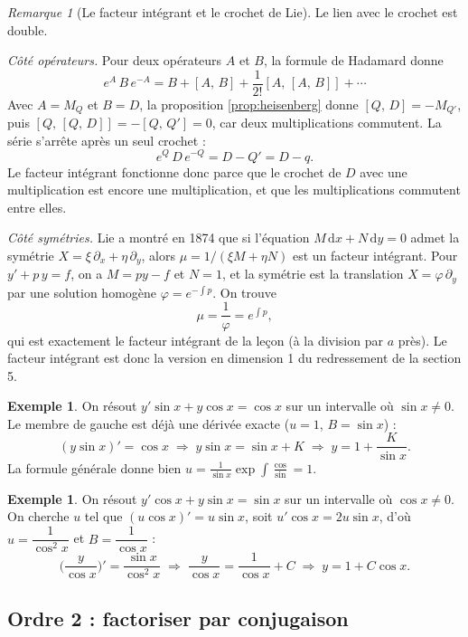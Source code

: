 \documentclass[11pt,a4paper]{article}
\theoremstyle{plain}
\theoremstyle{definition}
\newtheorem{exemple}[theoreme]{Exemple}
\theoremstyle{remark}
\newtheorem{remarque}[theoreme]{Remarque}
\newcommand{\Dx}{D}
\newcommand{\M}[1]{M_{#1}}
\newcommand{\cro}[2]{\left[#1,\,#2\right]}
\newcommand{\dd}{\mathrm{d}}
\begin{document}
\begin{remarque}[Le facteur intégrant et le crochet de Lie]
Le lien avec le crochet est double.

\emph{Côté opérateurs.} Pour deux opérateurs $A$ et $B$, la formule de Hadamard donne
\[
  e^{A}\,B\,e^{-A} = B + \cro{A}{B} + \frac{1}{2!}\cro{A}{\cro{A}{B}} + \cdots
\]
Avec $A = \M{Q}$ et $B = \Dx$, la proposition \ref{prop:heisenberg} donne $\cro{Q}{\Dx} = -\M{Q'}$, puis $\cro{Q}{\cro{Q}{\Dx}} = -\cro{Q}{Q'} = 0$, car deux multiplications commutent. La série s'arrête après un seul crochet :
\[
  e^{Q}\,\Dx\,e^{-Q} = \Dx - Q' = \Dx - q .
\]
Le facteur intégrant fonctionne donc parce que le crochet de $\Dx$ avec une multiplication est encore une multiplication, et que les multiplications commutent entre elles.

\emph{Côté symétries.} Lie a montré en 1874 que si l'équation $M\,\dd x + N\,\dd y = 0$ admet la symétrie $X = \xi\,\partial_x + \eta\,\partial_y$, alors $\mu = 1/(\xi M + \eta N)$ est un facteur intégrant. Pour $y' + p\,y = f$, on a $M = py - f$ et $N = 1$, et la symétrie est la translation $X = \varphi\,\partial_y$ par une solution homogène $\varphi = e^{-\int p}$. On trouve
\[
  \mu = \frac{1}{\varphi} = e^{\int p},
\]
qui est exactement le facteur intégrant de la leçon (à la division par $a$ près). Le facteur intégrant est donc la version en dimension 1 du redressement de la section 5.
\end{remarque}

\begin{exemple}
On résout $y'\sin x + y\cos x = \cos x$ sur un intervalle où $\sin x \neq 0$. Le membre de gauche est déjà une dérivée exacte ($u = 1$, $B = \sin x$) :
\[
  (y\sin x)' = \cos x
  \;\Longrightarrow\;
  y\sin x = \sin x + K
  \;\Longrightarrow\;
  y = 1 + \frac{K}{\sin x}.
\]
La formule générale donne bien $u = \frac{1}{\sin x}\exp\int\frac{\cos}{\sin} = 1$.
\end{exemple}

\begin{exemple}
On résout $y'\cos x + y\sin x = \sin x$ sur un intervalle où $\cos x \neq 0$. On cherche $u$ tel que $(u\cos x)' = u\sin x$, soit $u'\cos x = 2u\sin x$, d'où $u = \dfrac{1}{\cos^2 x}$ et $B = \dfrac{1}{\cos x}$ :
\[
  \Big(\frac{y}{\cos x}\Big)' = \frac{\sin x}{\cos^2 x}
  \;\Longrightarrow\;
  \frac{y}{\cos x} = \frac{1}{\cos x} + C
  \;\Longrightarrow\;
  y = 1 + C\cos x .
\]
\end{exemple}

\subsection{Ordre 2 : factoriser par conjugaison}
\end{document}
